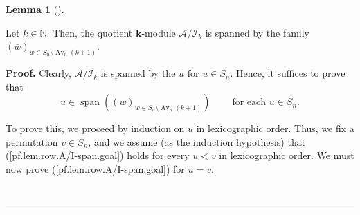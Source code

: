 \documentclass[numbers=enddot,12pt,final,onecolumn,notitlepage]{scrartcl}%
\numberwithin{exer}{subsection}
\theoremstyle{definition}
\newtheorem{lem}[theo]{Lemma}
\newenvironment{lemma}[1][]
{\begin{lem}[#1]\begin{leftbar}}
{\end{leftbar}\end{lem}}
\newenvironment{proof}[1][Proof]{\noindent\textbf{#1.} }{\ \rule{0.5em}{0.5em}}
\begin{document}
\begin{lemma}
\label{lem.row.A/I-span}Let $k\in\mathbb{N}$. Then, the quotient $\mathbf{k}%
$-module $\mathcal{A}/\mathcal{I}_{k}$ is spanned by the family $\left(
\overline{w}\right)  _{w\in S_{n}\setminus\operatorname*{Av}\nolimits_{n}%
\left(  k+1\right)  }$.
\end{lemma}

\begin{proof}
Clearly, $\mathcal{A}/\mathcal{I}_{k}$ is spanned by the $\overline{u}$ for
$u\in S_{n}$. Hence, it suffices to prove that
\begin{equation}
\overline{u}\in\operatorname*{span}\left(  \left(  \overline{w}\right)  _{w\in
S_{n}\setminus\operatorname*{Av}\nolimits_{n}\left(  k+1\right)  }\right)
\ \ \ \ \ \ \ \ \ \ \text{for each }u\in S_{n}.
\label{pf.lem.row.A/I-span.goal}%
\end{equation}


To prove this, we proceed by induction on $u$ in lexicographic order. Thus, we
fix a permutation $v\in S_{n}$, and we assume (as the induction hypothesis)
that (\ref{pf.lem.row.A/I-span.goal}) holds for every $u<v$ in lexicographic
order. We must now prove (\ref{pf.lem.row.A/I-span.goal}) for $u=v$.


\end{proof}
\end{document}

